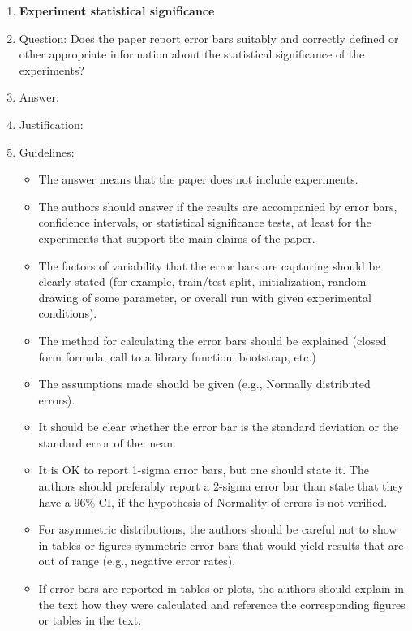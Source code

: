 \documentclass{article}
\begin{document}
\begin{enumerate}
\item {\bf Experiment statistical significance}
    \item[] Question: Does the paper report error bars suitably and correctly defined or other appropriate information about the statistical significance of the experiments?
    \item[] Answer: \answerTODO{} %
    \item[] Justification: \justificationTODO{}
    \item[] Guidelines:
    \begin{itemize}
        \item The answer \answerNA{} means that the paper does not include experiments.
        \item The authors should answer \answerYes{} if the results are accompanied by error bars, confidence intervals, or statistical significance tests, at least for the experiments that support the main claims of the paper.
        \item The factors of variability that the error bars are capturing should be clearly stated (for example, train/test split, initialization, random drawing of some parameter, or overall run with given experimental conditions).
        \item The method for calculating the error bars should be explained (closed form formula, call to a library function, bootstrap, etc.)
        \item The assumptions made should be given (e.g., Normally distributed errors).
        \item It should be clear whether the error bar is the standard deviation or the standard error of the mean.
        \item It is OK to report 1-sigma error bars, but one should state it. The authors should preferably report a 2-sigma error bar than state that they have a 96\% CI, if the hypothesis of Normality of errors is not verified.
        \item For asymmetric distributions, the authors should be careful not to show in tables or figures symmetric error bars that would yield results that are out of range (e.g., negative error rates).
        \item If error bars are reported in tables or plots, the authors should explain in the text how they were calculated and reference the corresponding figures or tables in the text.
    \end{itemize}


\end{enumerate}
\end{document}
